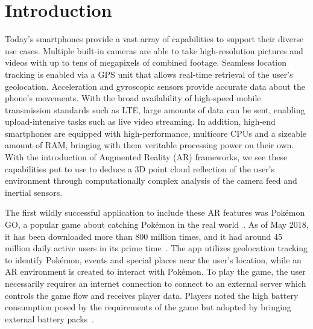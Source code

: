\section{Introduction}
Today's smartphones provide a vast array of capabilities to support their diverse use cases.
Multiple built-in cameras are able to take high-resolution pictures and videos with up to tens of megapixels of combined footage.
Seamless location tracking is enabled via a GPS unit that allows real-time retrieval of the user's geolocation.
Acceleration and gyroscopic sensors provide accurate data about the phone's movements.
With the broad availability of high-speed mobile transmission standards such as LTE, large amounts of data can be sent, enabling upload-intensive tasks such as live video streaming.
In addition, high-end smartphones are equipped with high-performance, multicore CPUs and a sizeable amount of RAM, bringing with them veritable processing power on their own.
With the introduction of Augmented Reality (AR) frameworks, we see these capabilities put to use to deduce a 3D point cloud reflection of the user's environment through computationally complex analysis of the camera feed and inertial sensors.

The first wildly successful application to include these AR features was Pokémon GO, a popular game about catching Pokémon in the real world~\cite{pkmgo}.
As of May 2018, it has been downloaded more than 800 million times, and it had around 45 million daily active users in its prime time~\cite{PkmDownloads}.
The app utilizes geolocation tracking to identify Pokémon, events and special places near the user's location, while an AR environment is created to interact with Pokémon.
To play the game, the user necessarily requires an internet connection to connect to an external server which controls the game flow and receives player data.
Players noted the high battery consumption posed by the requirements of the game but adopted by bringing external battery packs~\cite{PkmBattery}.

